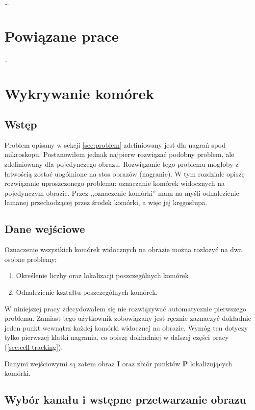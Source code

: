 \documentclass[declaration,shortabstract,mgr]{iithesis}
\newcommand{\image}{\mathbf{I}}
\begin{document}
\ldots %

\section{Powiązane prace}

\ldots %

\section{Wykrywanie komórek}

\subsection{Wstęp}

Problem opisany w sekcji \ref{sec:problem} zdefiniowany jest dla nagrań spod mikroskopu. Postanowiłem jednak najpierw rozwiązać podobny problem, ale zdefiniowany dla pojedynczego obrazu. Rozwiązanie tego problemu mogłoby z łatwością zostać uogólnione na stos obrazów (nagranie). W tym rozdziale opiszę rozwiązanie uproszczonego problemu: oznaczanie komórek widocznych na pojedynczym obrazie. Przez ,,oznaczenie komórki'' mam na myśli odnalezienie łamanej przechodzącej przez środek komórki, a więc jej kręgosłupa.

\subsection{Dane wejściowe}

Oznaczenie wszystkich komórek widocznych na obrazie można rozłożyć na dwa osobne problemy:
\begin{enumerate}
  \item Określenie liczby oraz lokalizacji poszczególnych komórek
  \item Odnalezienie kształtu poszczególnych komórek.
\end{enumerate}

W niniejszej pracy zdecydowałem się nie rozwiązywać automatycznie pierwszego problemu. Zamiast tego użytkownik zobowiązany jest ręcznie zaznaczyć dokładnie jeden punkt wewnątrz każdej komórki widocznej na obrazie. Wymóg ten dotyczy tylko pierwszej klatki nagrania, co opiszę dokładniej w dalszej części pracy (\ref{sec:cell-tracking}).

Danymi wejściowymi są zatem obraz $\image$ oraz zbiór punktów $\mathbf{P}$ lokalizujących komórki.

\subsection{Wybór kanału i wstępne przetwarzanie obrazu}
\end{document}
